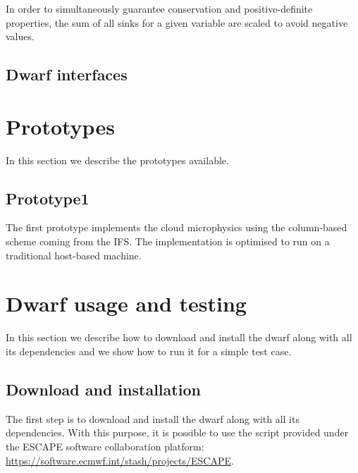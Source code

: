 \documentclass[
a4paper,     %
12pt,        %
article,
onecolumn,   %
openany,     %
]{memoir}
\begin{document}
In order to simultaneously guarantee conservation and
positive-definite properties, the sum of all sinks for 
a given variable are scaled to avoid negative values. 


\subsection{Dwarf interfaces}



\section{Prototypes}
In this section we describe the prototypes available.



\subsection{Prototype1}
The first prototype implements the cloud microphysics using 
the column-based scheme coming from the IFS. The implementation 
is optimised to run on a traditional host-based machine.




\section{Dwarf usage and testing}
In this section we describe how to download and install 
the dwarf along with all its dependencies and we show 
how to run it for a simple test case.



\subsection{Download and installation}
The first step is to download and install the dwarf along 
with all its dependencies. With this purpose, it is possible 
to use the script provided under the ESCAPE software collaboration 
platform:\\
\url{https://software.ecmwf.int/stash/projects/ESCAPE}.
\end{document}
